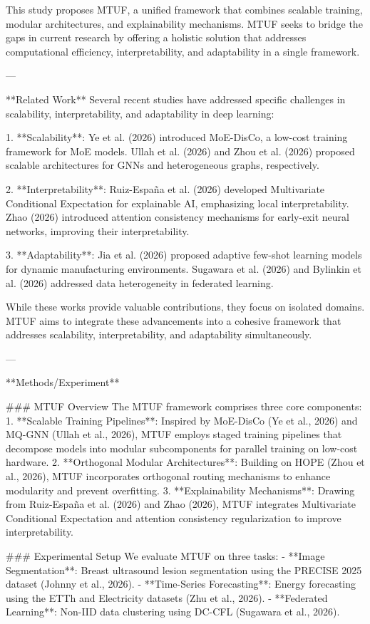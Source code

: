 This study proposes MTUF, a unified framework that combines scalable training, modular architectures, and explainability mechanisms. MTUF seeks to bridge the gaps in current research by offering a holistic solution that addresses computational efficiency, interpretability, and adaptability in a single framework.

---

**Related Work**  
Several recent studies have addressed specific challenges in scalability, interpretability, and adaptability in deep learning:

1. **Scalability**: Ye et al. (2026) introduced MoE-DisCo, a low-cost training framework for MoE models. Ullah et al. (2026) and Zhou et al. (2026) proposed scalable architectures for GNNs and heterogeneous graphs, respectively.

2. **Interpretability**: Ruiz-España et al. (2026) developed Multivariate Conditional Expectation for explainable AI, emphasizing local interpretability. Zhao (2026) introduced attention consistency mechanisms for early-exit neural networks, improving their interpretability.

3. **Adaptability**: Jia et al. (2026) proposed adaptive few-shot learning models for dynamic manufacturing environments. Sugawara et al. (2026) and Bylinkin et al. (2026) addressed data heterogeneity in federated learning.

While these works provide valuable contributions, they focus on isolated domains. MTUF aims to integrate these advancements into a cohesive framework that addresses scalability, interpretability, and adaptability simultaneously.

---

**Methods/Experiment**  

### MTUF Overview  
The MTUF framework comprises three core components:
1. **Scalable Training Pipelines**: Inspired by MoE-DisCo (Ye et al., 2026) and MQ-GNN (Ullah et al., 2026), MTUF employs staged training pipelines that decompose models into modular subcomponents for parallel training on low-cost hardware.
2. **Orthogonal Modular Architectures**: Building on HOPE (Zhou et al., 2026), MTUF incorporates orthogonal routing mechanisms to enhance modularity and prevent overfitting.
3. **Explainability Mechanisms**: Drawing from Ruiz-España et al. (2026) and Zhao (2026), MTUF integrates Multivariate Conditional Expectation and attention consistency regularization to improve interpretability.

### Experimental Setup  
We evaluate MTUF on three tasks:
- **Image Segmentation**: Breast ultrasound lesion segmentation using the PRECISE 2025 dataset (Johnny et al., 2026).
- **Time-Series Forecasting**: Energy forecasting using the ETTh and Electricity datasets (Zhu et al., 2026).
- **Federated Learning**: Non-IID data clustering using DC-CFL (Sugawara et al., 2026).

